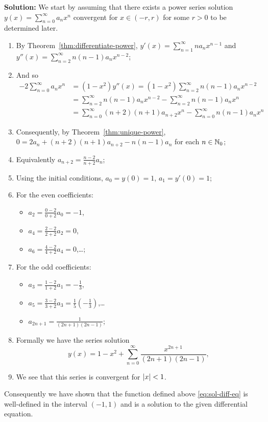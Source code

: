 \noindent
\textbf{Solution:}
We start by assuming that there exists a power series solution \(y(x) = \sum_{n=0}^{\infty}a_nx^n\) convergent for \(x \in (-r,r)\) for some \(r>0\) to be determined later.
\begin{enumerate}
  \item
        By Theorem~\ref{thm:differentiate-power}, \(y'(x) = \sum_{n=1}^{\infty}n a_n x^{n-1}\) and \(y''(x) = \sum_{n=2}^{\infty}n(n-1) a_n x^{n-2}\);
  \item And so
        \[
          \begin{aligned}
            -2 \sum_{n=0}^{\infty}a_nx^n
             & = (1-x^2)y''(x)
            = (1-x^2) \sum_{n=2}^{\infty}n(n-1) a_n x^{n-2}                                        \\
             & = \sum_{n=2}^{\infty}n(n-1) a_n x^{n-2} - \sum_{n=2}^{\infty}n(n-1) a_n x^{n}       \\
             & = \sum_{n=0}^{\infty}(n+2)(n+1) a_{n+2} x^{n} - \sum_{n=0}^{\infty}n(n-1) a_n x^{n}
          \end{aligned}
        \]
  \item Consequently, by Theorem~\ref{thm:unique-power}, \(0 = 2a_n +  (n+2)(n+1) a_{n+2} -  n(n-1) a_n \) for each \(n \in \mathbb{N}_0\);
  \item Equivalently \(a_{n+2} = \frac{n-2}{n+2}a_n\);
  \item Using the initial conditions,  \(a_0 = y(0) = 1\), \(a_1 = y'(0) = 1\);
  \item For the even coefficients:
        \begin{itemize}
          \item \(a_2 =  \frac{0-2}{0+2}a_0 = -1\),
          \item \(a_4 =  \frac{2-2}{2+2}a_2 = 0\),
          \item  \(a_6 =  \frac{4-2}{4+2}a_4 = 0\),\ldots;
        \end{itemize}
  \item For the odd coefficients:
        \begin{itemize}
          \item \(a_3 =  \frac{1-2}{1+2}a_1 = -\frac{1}{3}\),
          \item \(a_5= \frac{3-2}{3+2}a_3 = \frac{1}{5}(-\frac{1}{3})\),\ldots
          \item \(a_{2n+1} = \frac{1}{(2n+1)(2n-1)}\);
        \end{itemize}
  \item Formally we have the series solution
        \begin{equation}
          \label{eq:sol-diff-eq}
          y(x) = 1 - x^2 + \sum_{n=0}^{\infty} \frac{x^{2n+1}}{(2n+1)(2n-1)},
        \end{equation}
  \item We see that this series is convergent for \(\left|x\right|<1\).
\end{enumerate}
%
Consequently we have shown that the function defined above \eqref{eq:sol-diff-eq} is well-defined in the interval \((-1,1)\) and is a solution to the given differential equation.



